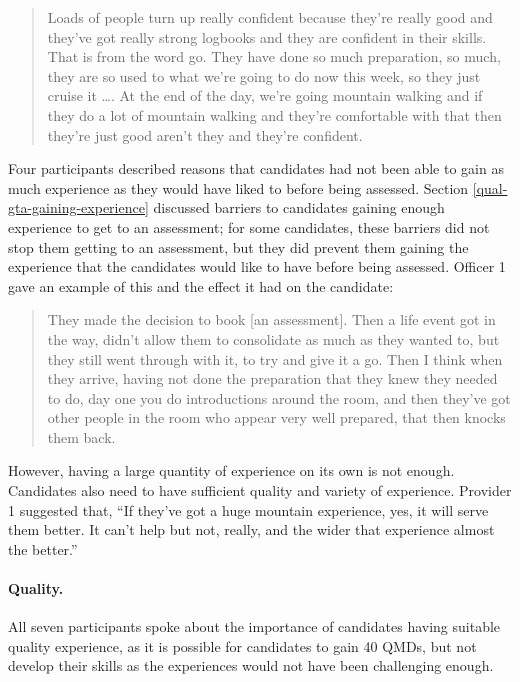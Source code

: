 \documentclass[
  12pt,
  a4paper,
]{book}
\begin{document}
\begin{quote}
Loads of people turn up really confident because they're really good and they've got really strong logbooks and they are confident in their skills. That is from the word go. They have done so much preparation, so much, they are so used to what we're going to do now this week, so they just cruise it \ldots. At the end of the day, we're going mountain walking and if they do a lot of mountain walking and they're comfortable with that then they're just good aren't they and they're confident.
\end{quote}

Four participants described reasons that candidates had not been able to gain as much experience as they would have liked to before being assessed. Section \ref{qual-gta-gaining-experience} discussed barriers to candidates gaining enough experience to get to an assessment; for some candidates, these barriers did not stop them getting to an assessment, but they did prevent them gaining the experience that the candidates would like to have before being assessed. Officer 1 gave an example of this and the effect it had on the candidate:

\begin{quote}
They made the decision to book {[}an assessment{]}. Then a life event got in the way, didn't allow them to consolidate as much as they wanted to, but they still went through with it, to try and give it a go. Then I think when they arrive, having not done the preparation that they knew they needed to do, day one you do introductions around the room, and then they've got other people in the room who appear very well prepared, that then knocks them back.
\end{quote}

However, having a large quantity of experience on its own is not enough. Candidates also need to have sufficient quality and variety of experience. Provider 1 suggested that, ``If they've got a huge mountain experience, yes, it will serve them better. It can't help but not, really, and the wider that experience almost the better.''

\hypertarget{quality.}{%
\paragraph{Quality.}\label{quality.}}

All seven participants spoke about the importance of candidates having suitable quality experience, as it is possible for candidates to gain 40 QMDs, but not develop their skills as the experiences would not have been challenging enough.
\end{document}

